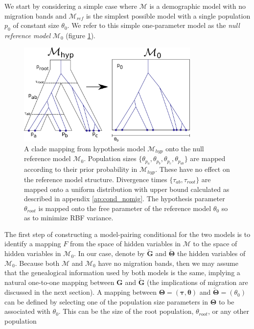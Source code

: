 \documentclass[11pt]{article}
\newcommand{\vect}[1]{\boldsymbol{\mathbf{#1}}}
\newcommand{\M}{\mathcal{M}}
\newcommand{\G}{\vect{G}}
\newcommand{\T}{\vect{\Theta}}
\newcommand{\Mref}{\M_{ref}}
\newcommand{\Gref}{\widetilde{\G}}
\newcommand{\Tref}{\widetilde{\T}}
\newcommand{\1}{\mathbbm{1}}
\newcommand{\troot}{\theta_{root}}
\newcommand{\taus}{\vect\tau}
\newcommand{\thetas}{\vect\theta}
\begin{document}
We start by considering a simple case where $\M$ is a demographic model with no migration bands and $\Mref$ is the simplest possible model with a single population $p_0$ of constant size $\theta_0$.
%
We refer to this simple one-parameter model as the {\em null reference model} $\M_0$ (figure \ref{fig:null_reference_model_no_migration}).
%
\begin{figure}[h]
\centering
\includegraphics[width=0.8\textwidth]
{null_reference_model_no_migration}
\captionsetup{width=.8\textwidth}
\caption{A clade mapping from hypothesis model $\M_{hyp}$ onto the null reference model $\M_0$. Population sizes $\{\theta_{p_a}, \theta_{p_b}, \theta_{p_c}, \theta_{p_{ab}}\}$ are mapped according to their prior probability in $\M_{hyp}$. These have no effect on the reference model structure. Divergence times $\{\tau_{ab}, \tau_{root}\}$ are mapped onto a uniform distribution with upper bound calculated as described in appendix \ref{ap:cond_nomig}. The  hypothesis parameter $\theta_{root}$ is mapped onto the free parameter of the reference model $\theta_0$ so as to minimize RBF variance.}
\label{fig:null_reference_model_no_migration}
\end{figure}
%
The first step of constructing a model-pairing conditional for the two models is to identify a mapping $F$ from the space
of hidden variables in $\M$ to the space of hidden variables in $\M_0$.
%
In our case, denote by $\Gref$ and $\Tref$ the hidden variables of $\M_0$.
%
Because both $\M$ and $\M_0$ have no migration bands, then we may assume that the genealogical information used
by both models is the same, implying a natural one-to-one mapping between $\G$ and $\Gref$ (the implications of migration are discussed in the next section).
%
A mapping between $\T=(\taus,\thetas)$ and $\Tref=(\theta_0)$ can be defined by selecting one of the population size parameters in $\T$
to be associated with $\theta_0$. This can be the size of the root population, $\troot$, or any other population
\end{document}

